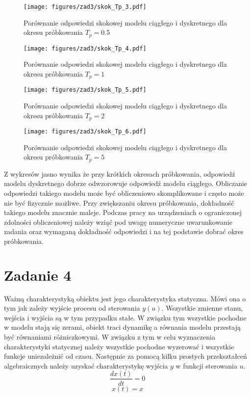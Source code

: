 \documentclass[a4paper,titlepage,11pt,floatssmall]{mwrep}
\begin{document}
\begin{figure}[H]
\centering
\texttt{[image: figures/zad3/skok\_Tp\_3.pdf]}
\caption{Porównanie odpowiedzi skokowej modelu ciągłego i dyskretnego dla okresu próbkowania $T_p = 0.5$}
\end{figure}


\begin{figure}[H]
\centering
\texttt{[image: figures/zad3/skok\_Tp\_4.pdf]}
\caption{Porównanie odpowiedzi skokowej modelu ciągłego i dyskretnego dla okresu próbkowania $T_p = 1$}
\end{figure}

\begin{figure}[H]
\centering
\texttt{[image: figures/zad3/skok\_Tp\_5.pdf]}
\caption{Porównanie odpowiedzi skokowej modelu ciągłego i dyskretnego dla okresu próbkowania $T_p = 2$}
\end{figure}

\begin{figure}[H]
\centering
\texttt{[image: figures/zad3/skok\_Tp\_6.pdf]}
\caption{Porównanie odpowiedzi skokowej modelu ciągłego i dyskretnego dla okresu próbkowania $T_p = 5$}
\end{figure}


\indent{} Z wykresów jasno wynika że przy krótkich okresach próbkowania, odpowiedź modelu dyskretnego dobrze odwzorowuje odpowiedź modelu ciągłego. Obliczanie odpowiedzi takiego modelu może być obliczeniowo skomplikowane i często może nie być fizycznie możliwe. Przy zwiększaniu okresu próbkowania, dokładność takiego modelu znacznie maleje. Podczas pracy na urządzeniach o ograniczonej zdolności obliczeniowej należy wziąć pod uwagę numeryczne uwarunkowanie zadania oraz wymaganą dokładność odpowiedzi i na tej podstawie dobrać okres próbkowania.


\section{Zadanie 4}
\indent{} Ważną charakterystyką obiektu jest jego charakterystyka statyczna. Mówi ona o tym jak zależy wyjście procesu od sterowania $y(u)$. Wszystkie zmienne stanu, wejścia i wyjścia są w tym przypadku stałe. W związku tym wszystkie pochodne w modelu stają się zerami, obiekt traci dynamikę a równania modelu przestają być równaniami różniczkowymi. W związku z tym w celu wyznaczenia charakterystyki statycznej należy wszystkie pochodne wyzerować i wszystkie funkcje uniezależnić od czasu. Następnie za pomocą kilku prostych przekształceń algebraicznych należy uzyskać charakterystykę wyjścia $y$ w funkcji sterowania $u$. 
\begin{equation*}
\frac{dx(t)}{dt} = 0 
\end{equation*}
\begin{equation*}
x(t) = x
\end{equation*}
\end{document}
